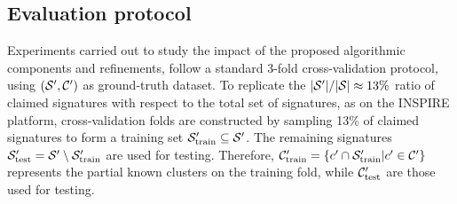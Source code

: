 \documentclass[runningheads,a4paper]{llncs}
\begin{document}
\subsection{Evaluation protocol}

Experiments carried out to study the impact of the proposed algorithmic
components and refinements, follow a
standard 3-fold cross-validation protocol, using $({\cal S}^\prime, {\cal
C}^\prime)$ as ground-truth dataset. To replicate the $|{\cal S}^\prime| /
|{\cal S}| \approx 13\%$ ratio of claimed signatures with respect to the total
set of signatures, as on the INSPIRE platform, cross-validation folds are
constructed by sampling 13\% of claimed signatures to form a training set ${\cal
S}_\text{train}^\prime \subseteq {\cal S}^\prime$.
The remaining signatures ${\cal S}_\text{test}^\prime = {\cal S}^\prime \setminus {\cal
S}_\text{train}^\prime$ are used for testing.
Therefore, ${\cal C}_\text{train}^\prime = \{ c^\prime \cap {\cal S}_\text{train}^\prime | c^\prime \in {\cal C}^\prime
\}$ represents the partial known clusters on the training fold, while ${\cal
C}_\text{test}^\prime$ are those used for testing.
\end{document}
